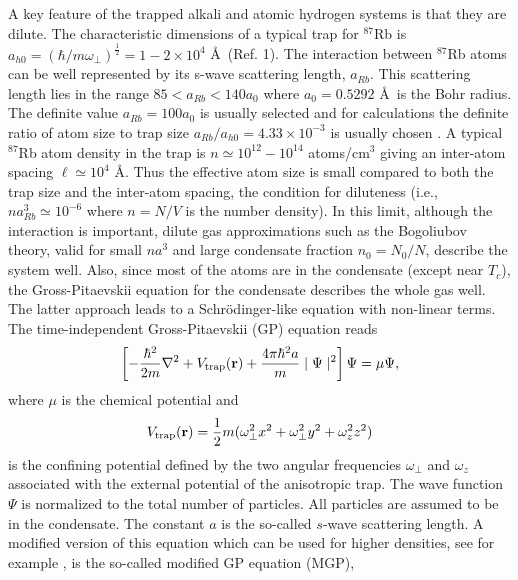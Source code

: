 A key feature of the trapped alkali and atomic hydrogen systems is that they are
dilute. The characteristic dimensions of a typical trap for $^{87}$Rb is
$a_{h0}=\left( {\hbar}/{m\omega_\perp}\right)^\frac{1}{2}=1-2 \times 10^4$
\AA\ (Ref. 1). The interaction between $^{87}$Rb atoms can be well represented
by its s-wave scattering length, $a_{Rb}$. This scattering length lies in the
range $85 < a_{Rb} < 140 a_0$ where $a_0 = 0.5292$ \AA\ is the Bohr radius.
The definite value $a_{Rb} = 100 a_0$ is usually selected and
for calculations the definite ratio of atom size to trap size 
$a_{Rb}/a_{h0} = 4.33 \times 10^{-3}$ 
is usually chosen \cite{dalfovo99}. A typical $^{87}$Rb atom
density in the trap is $n \simeq 10^{12}- 10^{14}$ atoms/cm$^3$ giving an
inter-atom spacing $\ell \simeq 10^4$ \AA. Thus the effective atom size is small
compared to both the trap size and the inter-atom spacing, the condition
for diluteness (i.e., $na^3_{Rb} \simeq 10^{-6}$ where $n = N/V$ is the number
density). In this limit,
although the interaction is important, dilute gas approximations such as the
Bogoliubov theory\cite{bogoliubov47}, valid for small $na^3$ and large
condensate fraction $n_0 = N_0/N$, describe the system well. Also, since most
of the atoms are in the condensate (except near $T_c$), the Gross-Pitaevskii 
equation\cite{gross61,pitaevskii61} for the condensate describes the whole gas
well. 
The latter approach leads to a Schr\"odinger-like equation with non-linear terms.
The time-independent  Gross-Pitaevskii (GP) equation reads 
\begin{equation}
  \left [ - \frac {\hbar^2}{2m} \nabla^2 + V_{\mathrm{trap}}({\bf r}) + 
   \frac{4\pi\hbar^2 a}{m} \mid \Psi \mid^2 \right ]\Psi=\mu\Psi , 
\label{gp1} 
\end{equation}
where $\mu$ is the chemical potential and 
\begin{equation}
  V_{\mathrm{trap}}({\bf r}) = \frac {1}{2} m (\omega_{\bot}^2 x^2 
  + \omega_{\bot}^2 y^2 +\omega_{z}^2 z^2 ) 
\label{trap}
\end{equation}
is the confining potential defined by the two angular frequencies
$\omega_{\bot}$ and $\omega_{z}$ associated with the external
potential of the anisotropic trap. The wave function $\Psi$ is
normalized to the total number of particles. All particles are assumed to be
in the condensate. The constant $a$ is the so-called $s$-wave scattering length.
A modified version of this equation which can be used for higher densities,
see for example \cite{jon2005,fabro99}, is the so-called 
modified GP equation (MGP), 
